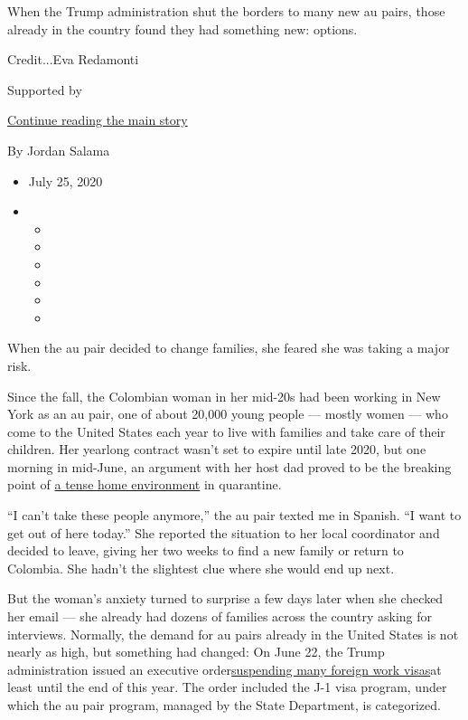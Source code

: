 When the Trump administration shut the borders to many new au pairs,
those already in the country found they had something new: options.

Credit...Eva Redamonti

Supported by

\protect\hyperlink{after-sponsor}{Continue reading the main story}

By Jordan Salama

\begin{itemize}
\item
  July 25, 2020
\item
  \begin{itemize}
  \item
  \item
  \item
  \item
  \item
  \item
  \end{itemize}
\end{itemize}

When the au pair decided to change families, she feared she was taking a
major risk.

Since the fall, the Colombian woman in her mid-20s had been working in
New York as an au pair, one of about 20,000 young people --- mostly
women --- who come to the United States each year to live with families
and take care of their children. Her yearlong contract wasn't set to
expire until late 2020, but one morning in mid-June, an argument with
her host dad proved to be the breaking point of
\href{https://www.nytimes3xbfgragh.onion/2020/07/17/style/this-is-not-the-america-these-au-pairs-were-expecting.html}{a
tense home environment} in quarantine.

``I can't take these people anymore,'' the au pair texted me in Spanish.
``I want to get out of here today.'' She reported the situation to her
local coordinator and decided to leave, giving her two weeks to find a
new family or return to Colombia. She hadn't the slightest clue where
she would end up next.

But the woman's anxiety turned to surprise a few days later when she
checked her email --- she already had dozens of families across the
country asking for interviews. Normally, the demand for au pairs already
in the United States is not nearly as high, but something had changed:
On June 22, the Trump administration issued an executive
order\href{https://www.nytimes3xbfgragh.onion/2020/06/19/us/foreign-worker-visas-trump-coronavirus.html}{suspending
many foreign work visas}at least until the end of this year. The order
included the J-1 visa program, under which the au pair program, managed
by the State Department, is categorized.

